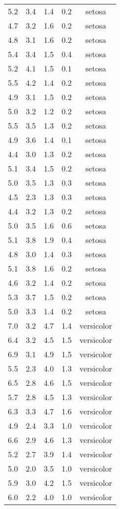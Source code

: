 \documentclass[
  letterpaper,
  DIV=11,
  numbers=noendperiod]{scrartcl}
\begin{document}
\begin{longtable}[]{@{}lrlrc@{}}
5.2 & 3.4 & 1.4 & 0.2 & setosa \\
4.7 & 3.2 & 1.6 & 0.2 & setosa \\
4.8 & 3.1 & 1.6 & 0.2 & setosa \\
5.4 & 3.4 & 1.5 & 0.4 & setosa \\
5.2 & 4.1 & 1.5 & 0.1 & setosa \\
5.5 & 4.2 & 1.4 & 0.2 & setosa \\
4.9 & 3.1 & 1.5 & 0.2 & setosa \\
5.0 & 3.2 & 1.2 & 0.2 & setosa \\
5.5 & 3.5 & 1.3 & 0.2 & setosa \\
4.9 & 3.6 & 1.4 & 0.1 & setosa \\
4.4 & 3.0 & 1.3 & 0.2 & setosa \\
5.1 & 3.4 & 1.5 & 0.2 & setosa \\
5.0 & 3.5 & 1.3 & 0.3 & setosa \\
4.5 & 2.3 & 1.3 & 0.3 & setosa \\
4.4 & 3.2 & 1.3 & 0.2 & setosa \\
5.0 & 3.5 & 1.6 & 0.6 & setosa \\
5.1 & 3.8 & 1.9 & 0.4 & setosa \\
4.8 & 3.0 & 1.4 & 0.3 & setosa \\
5.1 & 3.8 & 1.6 & 0.2 & setosa \\
4.6 & 3.2 & 1.4 & 0.2 & setosa \\
5.3 & 3.7 & 1.5 & 0.2 & setosa \\
5.0 & 3.3 & 1.4 & 0.2 & setosa \\
7.0 & 3.2 & 4.7 & 1.4 & versicolor \\
6.4 & 3.2 & 4.5 & 1.5 & versicolor \\
6.9 & 3.1 & 4.9 & 1.5 & versicolor \\
5.5 & 2.3 & 4.0 & 1.3 & versicolor \\
6.5 & 2.8 & 4.6 & 1.5 & versicolor \\
5.7 & 2.8 & 4.5 & 1.3 & versicolor \\
6.3 & 3.3 & 4.7 & 1.6 & versicolor \\
4.9 & 2.4 & 3.3 & 1.0 & versicolor \\
6.6 & 2.9 & 4.6 & 1.3 & versicolor \\
5.2 & 2.7 & 3.9 & 1.4 & versicolor \\
5.0 & 2.0 & 3.5 & 1.0 & versicolor \\
5.9 & 3.0 & 4.2 & 1.5 & versicolor \\
6.0 & 2.2 & 4.0 & 1.0 & versicolor \\

\end{longtable}
\end{document}
